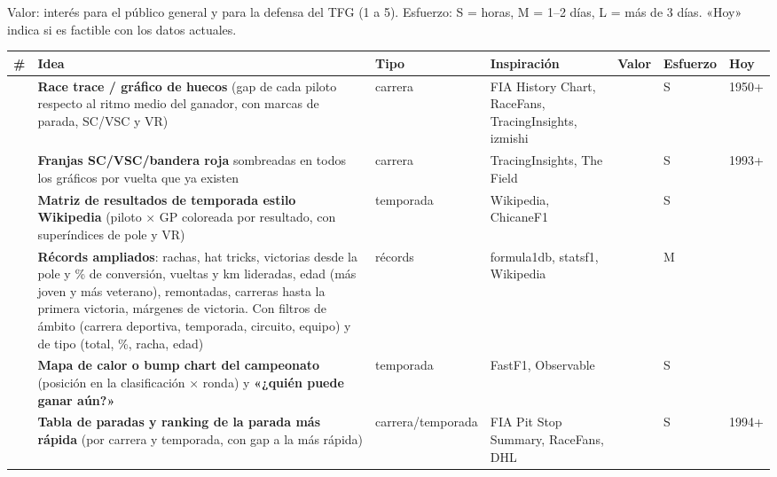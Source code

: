 Valor: interés para el público general y para la defensa del TFG (1 a 5). Esfuerzo: S = horas, M = 1–2 días, L = más de 3 días. «Hoy» indica si es factible con los datos actuales.

{\scriptsize\sloppy\setlength{\tabcolsep}{4pt}\renewcommand{\arraystretch}{1.15}
\begin{longtable}{@{}>{\raggedright\arraybackslash}p{0.030\dimexpr(\linewidth-56pt)\relax}>{\raggedright\arraybackslash}p{0.304\dimexpr(\linewidth-56pt)\relax}>{\raggedright\arraybackslash}p{0.104\dimexpr(\linewidth-56pt)\relax}>{\raggedright\arraybackslash}p{0.273\dimexpr(\linewidth-56pt)\relax}>{\raggedright\arraybackslash}p{0.037\dimexpr(\linewidth-56pt)\relax}>{\raggedright\arraybackslash}p{0.055\dimexpr(\linewidth-56pt)\relax}>{\raggedright\arraybackslash}p{0.197\dimexpr(\linewidth-56pt)\relax}@{}}
\toprule
\textbf{\#} & \textbf{Idea} & \textbf{Tipo} & \textbf{Inspiración} & \textbf{Valor} & \textbf{Esfuerzo} & \textbf{Hoy} \\
\midrule\endhead
\bottomrule\endlastfoot
1 & \textbf{Race trace / gráfico de huecos} (gap de cada piloto respecto al ritmo medio del ganador, con marcas de parada, SC/VSC y VR) & carrera & FIA History Chart, RaceFans, TracingInsights, izmishi & 5 & S & \si{} 1950+ \\
2 & \textbf{Franjas SC/VSC/bandera roja} sombreadas en todos los gráficos por vuelta que ya existen & carrera & TracingInsights, The Field & 4 & S & \si{} 1993+ \\
3 & \textbf{Matriz de resultados de temporada estilo Wikipedia} (piloto × GP coloreada por resultado, con superíndices de pole y VR) & temporada & Wikipedia, ChicaneF1 & 5 & S & \si{} \\
4 & \textbf{Récords ampliados}: rachas, hat tricks, victorias desde la pole y \% de conversión, vueltas y km lideradas, edad (más joven y más veterano), remontadas, carreras hasta la primera victoria, márgenes de victoria. Con filtros de ámbito (carrera deportiva, temporada, circuito, equipo) y de tipo (total, \%, racha, edad) & récords & formula1db, statsf1, Wikipedia & 5 & M & \si{} \\
5 & \textbf{Mapa de calor o bump chart del campeonato} (posición en la clasificación × ronda) y \textbf{«¿quién puede ganar aún?»} & temporada & FastF1, Observable & 4 & S & \si{} \\
6 & \textbf{Tabla de paradas y ranking de la parada más rápida} (por carrera y temporada, con gap a la más rápida) & carrera/temporada & FIA Pit Stop Summary, RaceFans, DHL & 4 & S & \si{} 1994+ \\

\end{longtable}}
